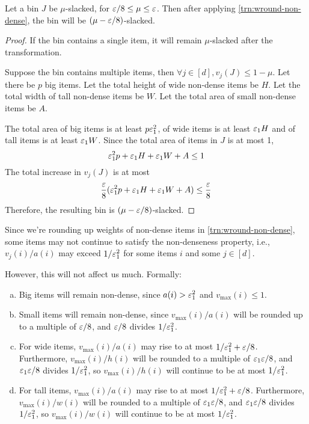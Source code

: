 \begin{lemma}
\label{lem:wround-non-dense-slackness}
Let a bin $J$ be $\mu$-slacked, for $\varepsilon/8 \le \mu \le \varepsilon$.
Then after applying \cref{trn:wround-non-dense},
the bin will be $(\mu - \varepsilon/8)$-slacked.
\end{lemma}
\begin{proof}
If the bin contains a single item, it will remain $\mu$-slacked after the transformation.

Suppose the bin contains multiple items, then $\forall j \in [d], v_j(J) \le 1-\mu$.
Let there be $p$ big items.
Let the total height of wide non-dense items be $H$.
Let the total width of tall non-dense items be $W$.
Let the total area of small non-dense items be $A$.

The total area of big items is at least $p\varepsilon_1^2$,
of wide items is at least $\varepsilon_1 H$
and of tall items is at least $\varepsilon_1 W$.
Since the total area of items in $J$ is at most 1,
\[ \varepsilon_1^2p + \varepsilon_1 H + \varepsilon_1 W + A \le 1 \]
The total increase in $v_j(J)$ is at most
\[ \frac{\varepsilon}{8}(\varepsilon_1^2p + \varepsilon_1 H + \varepsilon_1 W + A) \le \frac{\varepsilon}{8} \]
Therefore, the resulting bin is $(\mu - \varepsilon/8)$-slacked.
\end{proof}

\begin{observation}
\label{obs:non-dense-vinc}
Since we're rounding up weights of non-dense items in \cref{trn:wround-non-dense},
some items may not continue to satisfy the non-denseness property,
i.e., $v_j(i)/a(i)$ may exceed $1/\varepsilon_1^2$ for some items $i$ and some $j \in [d]$.

However, this will not affect us much. Formally:
\begin{enumerate}[(a)]
\item Big items will remain non-dense, since $a(i) > \varepsilon_1^2$ and $v_{\max}(i) \le 1$.
\item Small items will remain non-dense, since $v_{\max}(i)/a(i)$ will be rounded up to
a multiple of $\varepsilon/8$, and $\varepsilon/8$ divides $1/\varepsilon_1^2$.
\item For wide items, $v_{\max}(i)/a(i)$ may rise to at most $1/\varepsilon_1^2 + \varepsilon/8$.
Furthermore, $v_{\max}(i)/h(i)$ will be rounded to a multiple of $\varepsilon_1\varepsilon/8$,
and $\varepsilon_1\varepsilon/8$ divides $1/\varepsilon_1^2$, so $v_{\max}(i)/h(i)$ will continue to be
at most $1/\varepsilon_1^2$.
\item \label{item:non-dense-vinc:tall} For tall items,
$v_{\max}(i)/a(i)$ may rise to at most $1/\varepsilon_1^2 + \varepsilon/8$.
Furthermore, $v_{\max}(i)/w(i)$ will be rounded to a multiple of $\varepsilon_1\varepsilon/8$,
and $\varepsilon_1\varepsilon/8$ divides $1/\varepsilon_1^2$, so $v_{\max}(i)/w(i)$ will continue to be
at most $1/\varepsilon_1^2$.
\end{enumerate}
\end{observation}

